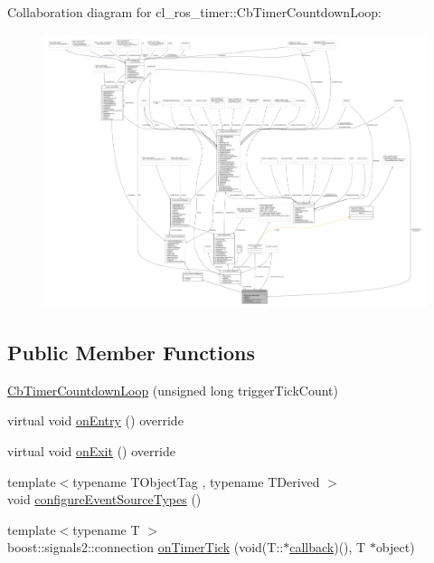 Collaboration diagram for cl\+\_\+ros\+\_\+timer\+:\+:Cb\+Timer\+Countdown\+Loop\+:
\nopagebreak
\begin{figure}[H]
\begin{center}
\leavevmode
\includegraphics[width=350pt]{classcl__ros__timer_1_1CbTimerCountdownLoop__coll__graph}
\end{center}
\end{figure}
\subsection*{Public Member Functions}
\begin{DoxyCompactItemize}
\item 
\hyperlink{classcl__ros__timer_1_1CbTimerCountdownLoop_a8cdfe250d9469ea019b61051be123195}{Cb\+Timer\+Countdown\+Loop} (unsigned long trigger\+Tick\+Count)
\item 
virtual void \hyperlink{classcl__ros__timer_1_1CbTimerCountdownLoop_aa088f15db4fb2c307c86b30b2e1f7744}{on\+Entry} () override
\item 
virtual void \hyperlink{classcl__ros__timer_1_1CbTimerCountdownLoop_a5623e9fdd8f0fb23e8707f7816c099d6}{on\+Exit} () override
\item 
{\footnotesize template$<$typename T\+Object\+Tag , typename T\+Derived $>$ }\\void \hyperlink{classcl__ros__timer_1_1CbTimerCountdownLoop_a8672075f8a3cbf4ef3f50af0eed8fa53}{configure\+Event\+Source\+Types} ()
\item 
{\footnotesize template$<$typename T $>$ }\\boost\+::signals2\+::connection \hyperlink{classcl__ros__timer_1_1CbTimerCountdownLoop_ad251cc8444ca7070f64658bbb77e1275}{on\+Timer\+Tick} (void(T\+::$\ast$\hyperlink{sm__ridgeback__barrel__search__2_2servers_2opencv__perception__node_2opencv__perception__node_8cpp_a050e697bd654facce10ea3f6549669b3}{callback})(), T $\ast$object)
\end{DoxyCompactItemize}
